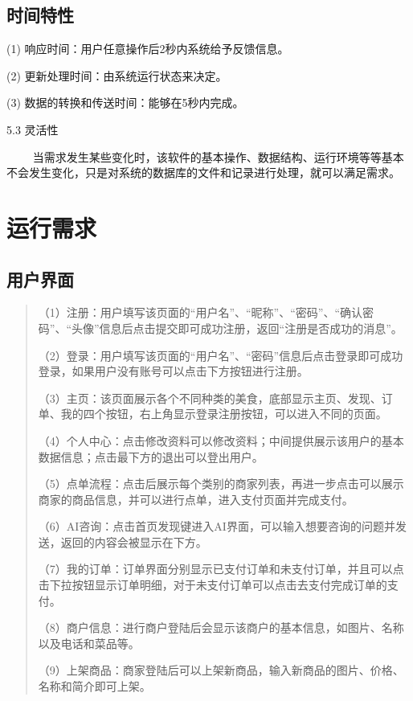 \subsection{时间特性}

(1) 响应时间：用户任意操作后2秒内系统给予反馈信息。

(2) 更新处理时间：由系统运行状态来决定。

(3) 数据的转换和传送时间：能够在5秒内完成。

5.3 灵活性

  
当需求发生某些变化时，该软件的基本操作、数据结构、运行环境等等基本不会发生变化，只是对系统的数据库的文件和记录进行处理，就可以满足需求。

\section{运行需求}

\subsection{用户界面}


\begin{quote}
（1）注册：用户填写该页面的``用户名''、``昵称''、``密码''、``确认密码''、``头像''信息后点击提交即可成功注册，返回``注册是否成功的消息''。

（2）登录：用户填写该页面的``用户名''、``密码''信息后点击登录即可成功登录，如果用户没有账号可以点击下方按钮进行注册。

（3）主页：该页面展示各个不同种类的美食，底部显示主页、发现、订单、我的四个按钮，右上角显示登录注册按钮，可以进入不同的页面。

（4）个人中心：点击修改资料可以修改资料；中间提供展示该用户的基本数据信息；点击最下方的退出可以登出用户。

（5）点单流程：点击后展示每个类别的商家列表，再进一步点击可以展示商家的商品信息，并可以进行点单，进入支付页面并完成支付。

（6）AI咨询：点击首页发现键进入AI界面，可以输入想要咨询的问题并发送，返回的内容会被显示在下方。

（7）我的订单：订单界面分别显示已支付订单和未支付订单，并且可以点击下拉按钮显示订单明细，对于未支付订单可以点击去支付完成订单的支付。

（8）商户信息：进行商户登陆后会显示该商户的基本信息，如图片、名称以及电话和菜品等。

（9）上架商品：商家登陆后可以上架新商品，输入新商品的图片、价格、名称和简介即可上架。
\end{quote}

